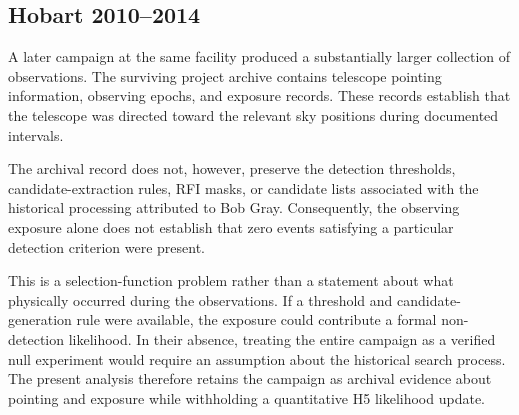 \documentclass[twocolumn]{aastex701}
\begin{document}
\subsection{Hobart 2010--2014}

A later campaign at the same facility produced a substantially larger collection of observations. The surviving project archive contains telescope pointing information, observing epochs, and exposure records. These records establish that the telescope was directed toward the relevant sky positions during documented intervals.

The archival record does not, however, preserve the detection thresholds, candidate-extraction rules, RFI masks, or candidate lists associated with the historical processing attributed to Bob Gray. Consequently, the observing exposure alone does not establish that zero events satisfying a particular detection criterion were present.

This is a selection-function problem rather than a statement about what physically occurred during the observations. If a threshold and candidate-generation rule were available, the exposure could contribute a formal non-detection likelihood. In their absence, treating the entire campaign as a verified null experiment would require an assumption about the historical search process. The present analysis therefore retains the campaign as archival evidence about pointing and exposure while withholding a quantitative H5 likelihood update.
\end{document}
